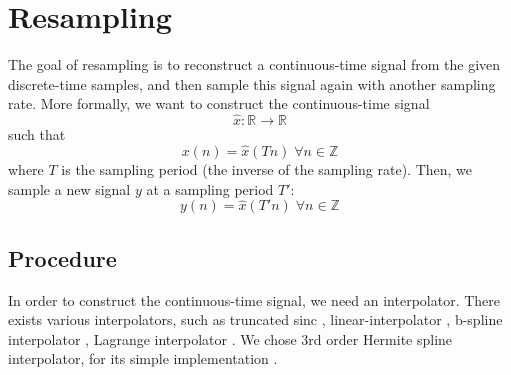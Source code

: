 \documentclass[letterpaper]{article}
\theoremstyle{definition}
\theoremstyle{remark}
\begin{document}
\section{Resampling}
The goal of resampling is to reconstruct a continuous-time signal from the given
discrete-time samples, and then sample this signal again with another sampling
rate. More formally, we want to construct the continuous-time signal
\begin{equation}\hat x:\mathbb{R}\to\mathbb{R}\end{equation}
such that
\begin{equation}x(n) = \hat x(Tn) \;\forall n\in\mathbb{Z}\end{equation}
where \(T\) is the sampling period (the inverse of the sampling rate). Then, we
sample a new signal \(y\) at a sampling period \(T'\):
\begin{equation*}y(n) = \hat x(T'n) \;\forall n\in\mathbb{Z}\end{equation*}

\subsection{Procedure}
In order to construct the continuous-time signal, we need an interpolator. There
exists various interpolators, such as truncated sinc
\citep{duncan1988fundamentals, rossum1989an}, linear-interpolator
\citep{rossum1993}, b-spline interpolator \citep{Sankar1998},
Lagrange interpolator \citep{Schafer1973}. We chose 3rd order Hermite spline
interpolator, for its simple implementation \citep{Grisoni97anhermitian}.
\end{document}
